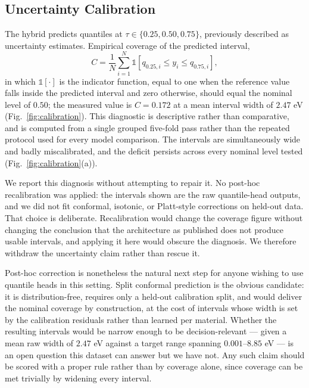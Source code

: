 \documentclass{ieeeaccess}
\begin{document}
\subsection{Uncertainty Calibration}
The hybrid predicts quantiles at $\tau \in \{0.25, 0.50, 0.75\}$, previously described as uncertainty estimates. Empirical coverage of the predicted interval,
\begin{equation}
C = \frac{1}{N}\sum_{i=1}^{N}
  \mathbb{1}\!\left[q_{0.25,i} \leq y_i \leq q_{0.75,i}\right],
\label{eq:coverage}
\end{equation}
in which $\mathbb{1}[\cdot]$ is the indicator function, equal to one when the reference value falls inside the predicted interval and zero otherwise, should equal the nominal level of $0.50$; the measured value is $C = 0.172$ at a mean interval width of $2.47$ eV (Fig.~\ref{fig:calibration}). This diagnostic is descriptive rather than comparative, and is computed from a single grouped five-fold pass rather than the repeated protocol used for every model comparison. The intervals are simultaneously wide and badly miscalibrated, and the deficit persists across every nominal level tested (Fig.~\ref{fig:calibration}(a)).

We report this diagnosis without attempting to repair it. No post-hoc recalibration was applied: the intervals shown are the raw quantile-head outputs, and we did not fit conformal, isotonic, or Platt-style corrections on held-out data. That choice is deliberate. Recalibration would change the coverage figure without changing the conclusion that the architecture as published does not produce usable intervals, and applying it here would obscure the diagnosis. We therefore withdraw the uncertainty claim rather than rescue it.

Post-hoc correction is nonetheless the natural next step for anyone wishing to use quantile heads in this setting. Split conformal prediction is the obvious candidate: it is distribution-free, requires only a held-out calibration split, and would deliver the nominal coverage by construction, at the cost of intervals whose width is set by the calibration residuals rather than learned per material. Whether the resulting intervals would be narrow enough to be decision-relevant --- given a mean raw width of $2.47$ eV against a target range spanning $0.001$--$8.85$ eV --- is an open question this dataset can answer but we have not. Any such claim should be scored with a proper rule \cite{gneiting2007probabilistic} rather than by coverage alone, since coverage can be met trivially by widening every interval.
\end{document}
